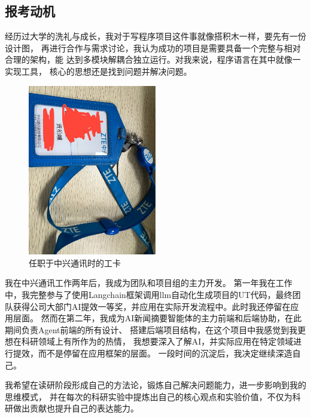 \documentclass{article}
\begin{document}
\begin{bibunit}[alpha]
	\section{报考动机}
	经历过大学的洗礼与成长，我对于写程序项目这件事就像搭积木一样，要先有一份设计图，
	再进行合作与需求讨论，我认为成功的项目是需要具备一个完整与相对合理的架构，能
	达到多模块解耦合独立运行。对我来说，程序语言在其中就像一实现工具，
	核心的思想还是找到问题并解决问题。

	\begin{figure}[htbp]
		\centering
		\includegraphics[angle=90, width=0.5\textwidth]{./img/work_carkd.jpg}  %
		\caption{任职于中兴通讯时的工卡}
		\label{fig:workCard}
	\end{figure}

	我在中兴通讯工作两年后，我成为团队和项目组的主力开发。
	第一年我在工作中，我完整参与了使用Langchain框架调用llm自动化生成项目的UT代码，最终团队获得公司大部门AI提效一等奖，并应用在实际开发流程中。此时我还停留在应用层面。
	然而在第二年，我成为AI新闻摘要智能体的主力前端和后端协助，在此期间负责Agent前端的所有设计、
	搭建后端项目结构，在这个项目中我感觉到我更想在科研领域上有所作为的热情，
	我想要深入了解AI，并实际应用在特定领域进行提效，而不是停留在应用框架的层面。
	一段时间的沉淀后，我决定继续深造自己。

	我希望在读研阶段形成自己的方法论，锻炼自己解决问题能力，进一步影响到我的思维模式，
	并在每次的科研实验中提炼出自己的核心观点和实验价值，不仅为科研做出贡献也提升自己的表达能力。
	\putbib[refs2]
\end{bibunit}
\end{document}
